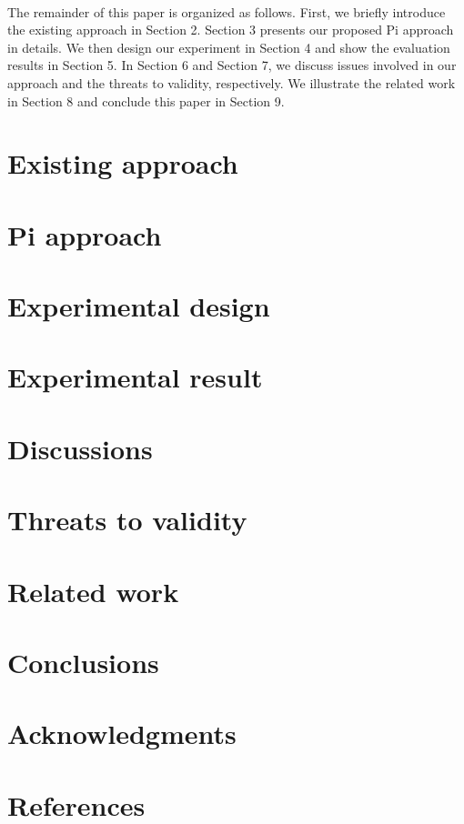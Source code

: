 \documentclass{article}
\begin{document}
\paragraph{}
The remainder of this paper is organized as follows. First, we briefly introduce the existing approach in Section 2. Section 3 presents our proposed Pi approach in details. We then design our experiment in Section 4 and show the evaluation results in Section 5. In Section 6 and Section 7, we discuss issues involved in our approach and the threats to validity, respectively. We 
illustrate the related work in Section 8 and conclude this paper in Section 9.

\section{Existing approach}

\section{Pi approach}

\section{Experimental design}

\section{Experimental result}

\section{Discussions}

\section{Threats to validity}

\section{Related work}

\section{Conclusions}

\section{Acknowledgments}

\section{References}
\end{document}
